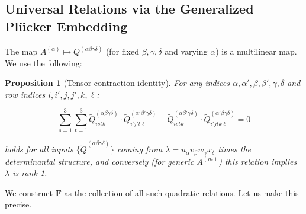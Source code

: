 \documentclass[12pt]{article}
\newtheorem{proposition}{Proposition}
\theoremstyle{definition}
\begin{document}
\subsection{Universal Relations via the Generalized Plücker Embedding}

The map $A^{(\alpha)}\mapsto Q^{(\alpha\beta\gamma\delta)}$ (for fixed $\beta,\gamma,\delta$ and varying $\alpha$) is a multilinear map. We use the following:

\begin{proposition}[Tensor contraction identity]\label{prop:contraction}
For any indices $\alpha,\alpha',\beta,\beta',\gamma,\delta$ and row indices $i,i',j,j',k,\ell$:

\begin{equation}\label{eq:main-relation}
\sum_{s=1}^3\sum_{t=1}^3\tilde{Q}^{(\alpha\beta\gamma\delta)}_{istk}\cdot\tilde{Q}^{(\alpha'\beta'\gamma\delta)}_{i'j't\ell} - \tilde{Q}^{(\alpha\beta'\gamma\delta)}_{istk}\cdot\tilde{Q}^{(\alpha'\beta\gamma\delta)}_{i'jtk\ell} = 0
\end{equation}

holds for all inputs $\{{\tilde Q}^{(\alpha\beta\gamma\delta)}\}$ coming from $\lambda = u_\alpha v_\beta w_\gamma x_\delta$ times the determinantal structure, and conversely (for generic $A^{(m)}$) this relation implies $\lambda$ is rank-1.
\end{proposition}

We construct $\mathbf{F}$ as the collection of all such quadratic relations. Let us make this precise.
\end{document}

